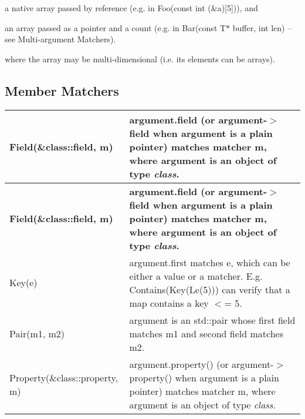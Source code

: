 \begin{DoxyEnumerate}
\item a native array passed by reference (e.\+g. in {\ttfamily Foo(const int (\&a)\mbox{[}5\mbox{]})}), and
\end{DoxyEnumerate}
\begin{DoxyEnumerate}
\item an array passed as a pointer and a count (e.\+g. in {\ttfamily Bar(const T$\ast$ buffer, int len)} -- see Multi-\/argument Matchers).
\end{DoxyEnumerate}

where the array may be multi-\/dimensional (i.\+e. its elements can be arrays).

\subsection*{Member Matchers}

\tabulinesep=1mm
\begin{longtabu} spread 0pt [c]{*{2}{|X[-1]}|}
\hline
\rowcolor{\tableheadbgcolor}\textbf{ {\ttfamily Field(\&class\+::field, m)}}&\textbf{ {\ttfamily argument.\+field} (or {\ttfamily argument-\/$>$field} when {\ttfamily argument} is a plain pointer) matches matcher {\ttfamily m}, where {\ttfamily argument} is an object of type {\itshape class}.  }\\
\endfirsthead
\hline
\endfoot
\hline
\rowcolor{\tableheadbgcolor}\textbf{ {\ttfamily Field(\&class\+::field, m)}}&\textbf{ {\ttfamily argument.\+field} (or {\ttfamily argument-\/$>$field} when {\ttfamily argument} is a plain pointer) matches matcher {\ttfamily m}, where {\ttfamily argument} is an object of type {\itshape class}.  }\\
\endhead
{\ttfamily Key(e)} &{\ttfamily argument.\+first} matches {\ttfamily e}, which can be either a value or a matcher. E.\+g. {\ttfamily Contains(Key(\+Le(5)))} can verify that a {\ttfamily map} contains a key {\ttfamily $<$= 5}. \\
{\ttfamily Pair(m1, m2)} &{\ttfamily argument} is an {\ttfamily std\+::pair} whose {\ttfamily first} field matches {\ttfamily m1} and {\ttfamily second} field matches {\ttfamily m2}. \\
{\ttfamily Property(\&class\+::property, m)}&{\ttfamily argument.\+property()} (or {\ttfamily argument-\/$>$property()} when {\ttfamily argument} is a plain pointer) matches matcher {\ttfamily m}, where {\ttfamily argument} is an object of type {\itshape class}. \\
\end{longtabu}
